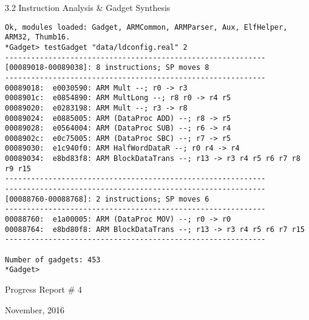 \documentclass[9pt]{beamer}
\begin{document}
\begin{frame}[fragile]{3.2 Instruction Analysis \& Gadget Synthesis}
\small
\begin{verbatim}
Ok, modules loaded: Gadget, ARMCommon, ARMParser, Aux, ElfHelper, ARM32, Thumb16.
*Gadget> testGadget "data/ldconfig.real" 2
------------------------------------------------------------
[00089018-00089038]: 8 instructions; SP moves 8
------------------------------------------------------------
00089018:  e0030590: ARM Mult --; r0 -> r3 
0008901c:  e0854890: ARM MultLong --; r8 r0 -> r4 r5 
00089020:  e0283198: ARM Mult --; r3 -> r8 
00089024:  e0885005: ARM (DataProc ADD) --; r8 -> r5 
00089028:  e0564004: ARM (DataProc SUB) --; r6 -> r4 
0008902c:  e0c75005: ARM (DataProc SBC) --; r7 -> r5 
00089030:  e1c940f0: ARM HalfWordDataR --; r0 r4 -> r4 
00089034:  e8bd83f8: ARM BlockDataTrans --; r13 -> r3 r4 r5 r6 r7 r8 r9 r15 
------------------------------------------------------------
------------------------------------------------------------
[00088760-00088768]: 2 instructions; SP moves 6
------------------------------------------------------------
00088760:  e1a00005: ARM (DataProc MOV) --; r0 -> r0 
00088764:  e8bd80f8: ARM BlockDataTrans --; r13 -> r3 r4 r5 r6 r7 r15 
------------------------------------------------------------

Number of gadgets: 453
*Gadget> 

\end{verbatim}

    
\end{frame}

\begin{frame}
\begin{center}    
    {\huge Progress Report \# 4}
    \vspace{.3cm}
    
    {\large November, 2016}
    \end{center} 
    
\end{frame}
\end{document}
